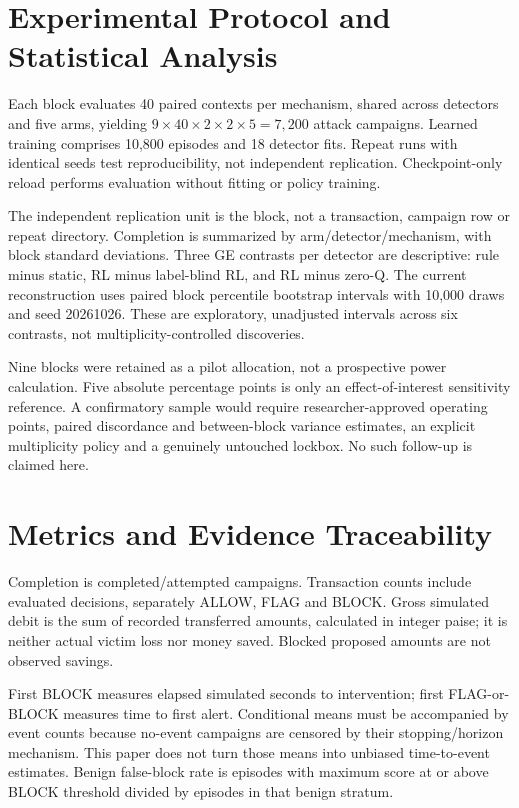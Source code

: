 \documentclass[conference]{IEEEtran}
\begin{document}
\section{Experimental Protocol and Statistical Analysis}
Each block evaluates 40 paired contexts per mechanism, shared across detectors and five arms, yielding \(9\times40\times2\times2\times5=7,200\) attack campaigns. Learned training comprises 10,800 episodes and 18 detector fits. Repeat runs with identical seeds test reproducibility, not independent replication. Checkpoint-only reload performs evaluation without fitting or policy training.

The independent replication unit is the block, not a transaction, campaign row or repeat directory. Completion is summarized by arm/detector/mechanism, with block standard deviations. Three GE contrasts per detector are descriptive: rule minus static, RL minus label-blind RL, and RL minus zero-Q. The current reconstruction uses paired block percentile bootstrap intervals with 10,000 draws and seed 20261026. These are exploratory, unadjusted intervals across six contrasts, not multiplicity-controlled discoveries.

Nine blocks were retained as a pilot allocation, not a prospective power calculation. Five absolute percentage points is only an effect-of-interest sensitivity reference. A confirmatory sample would require researcher-approved operating points, paired discordance and between-block variance estimates, an explicit multiplicity policy and a genuinely untouched lockbox. No such follow-up is claimed here.

\section{Metrics and Evidence Traceability}
Completion is completed/attempted campaigns. Transaction counts include evaluated decisions, separately ALLOW, FLAG and BLOCK. Gross simulated debit is the sum of recorded transferred amounts, calculated in integer paise; it is neither actual victim loss nor money saved. Blocked proposed amounts are not observed savings.

First BLOCK measures elapsed simulated seconds to intervention; first FLAG-or-BLOCK measures time to first alert. Conditional means must be accompanied by event counts because no-event campaigns are censored by their stopping/horizon mechanism. This paper does not turn those means into unbiased time-to-event estimates. Benign false-block rate is episodes with maximum score at or above BLOCK threshold divided by episodes in that benign stratum.
\end{document}

